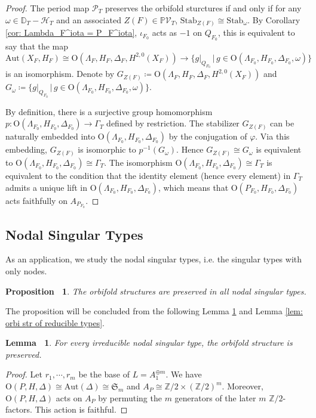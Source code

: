 \documentclass[12pt,reqno,a4paper]{amsart}
\newtheorem{lem}[thm]{Lemma~}
\newtheorem{prop}[thm]{Proposition~}
\theoremstyle{remark}
\theoremstyle{definition}
\begin{document}
\begin{proof}
The period map $\mathscr{P}_T$ preserves the orbifold sturctures if and only if for any $\omega\in \mathbb{D}_T-\mathcal{H}_T$ and an associated $Z(F)\in \mathbb{P}\mathcal{V}_T$, $\mathrm{Stab}_{Z(F)} \cong \mathrm{Stab}_\omega$.
By Corollary \ref{cor: Lambda_F^iota = P_F^iota}, $\iota_{F_0}$ acts as $-1$ on $Q_{F_0}$, this is equivalent to say that the map
\begin{equation*}
    \mathrm{Aut}(X_F,H_F)\cong \mathrm{O}(\Lambda_F,H_F,\Delta_F,H^{2,0}(X_F)) \to \{ g|_{Q_{F_0}} \,\big|\, g\in \mathrm{O}(\Lambda_{F_0},H_{F_0},\Delta_{F_0},\omega) \}
\end{equation*}
is an isomorphism.
Denote by $G_{Z(F)}\coloneqq \mathrm{O}(\Lambda_F,H_F,\Delta_F,H^{2,0}(X_F))$ and $G_\omega\coloneqq \{ g|_{Q_{F_0}} \,\big|\, g\in \mathrm{O}(\Lambda_{F_0},H_{F_0},\Delta_{F_0},\omega) \}$.

By definition, there is a surjective group homomorphism $p\colon \mathrm{O}(\Lambda_{F_0},H_{F_0},\Delta_{F_0})\to \Gamma_T$ defined by restriction.
The stabilizer $G_{Z(F)}$ can be naturally embedded into $\mathrm{O}(\Lambda_{F_0},H_{F_0},\Delta_{F_0})$ by the conjugation of $\varphi$.
Via this embedding, $G_{Z(F)}$ is isomorphic to $p^{-1}(G_\omega)$.
Hence $G_{Z(F)} \cong G_\omega$ is equivalent to $\mathrm{O}(\Lambda_{F_0},H_{F_0},\Delta_{F_0}) \cong \Gamma_T$.
The isomorphism $\mathrm{O}(\Lambda_{F_0},H_{F_0},\Delta_{F_0}) \cong \Gamma_T$ is equivalent to the condition that the identity element (hence every element) in $\Gamma_T$ admits a unique lift in $\mathrm{O}(\Lambda_{F_0},H_{F_0},\Delta_{F_0})$, which means that $\mathrm{O}(P_{F_0},H_{F_0},\Delta_{F_0})$ acts faithfully on $A_{P_{F_0}}$.
\end{proof}


\subsection{Nodal Singular Types}
As an application, we study the nodal singular types, i.e. the singular types with only nodes.
\begin{prop}
\label{prop: orbi str of nodal types}
    The orbifold structures are preserved in all nodal singular types.
\end{prop}
The proposition will be concluded from the following Lemma \ref{lem: orbi str of irred nodal types} and Lemma \ref{lem: orbi str of reducible types}.
\begin{lem}
\label{lem: orbi str of irred nodal types}
    For every irreducible nodal singular type, the orbifold structure is preserved.
\end{lem}
\begin{proof}
    Let $r_1,\cdots,r_m$ be the base of $L=A_1^{\oplus m}$.
    We have $\mathrm{O}(P,H,\Delta)\cong\mathrm{Aut}(\Delta)\cong\mathfrak{S}_m$ and $A_P\cong\mathbb{Z}/2\times(\mathbb{Z}/2)^m$.
    Moreover, $\mathrm{O}(P,H,\Delta)$ acts on $A_P$ by permuting the $m$ generators of the later $m$ $\mathbb{Z}/2$-factors.
    This action is faithful.
\end{proof}
\end{document}
